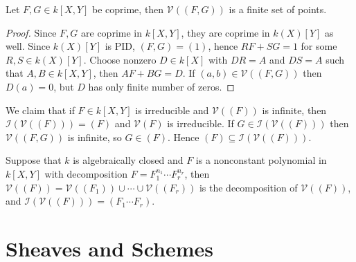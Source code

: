 \documentclass[11pt]{book}
\begin{document}
\begin{proposition}Let $F,G\in k[X,Y]$ be coprime, then $\mathcal{V}((F,G))$ is a finite set of points.
\begin{proof}
Since $F,G$ are coprime in $k[X,Y]$, they are coprime in $k(X)[Y]$ as well. Since $k(X)[Y]$ is PID, $(F,G)=(1)$, hence $RF+SG=1$ for some $R,S\in k(X)[Y]$. Choose nonzero $D\in k[X]$ with $DR=A$ and $DS=A$ such that $A,B\in k[X,Y]$, then $AF+BG=D$. If $(a,b)\in \mathcal{V}((F,G))$ then $D(a)=0$, but $D$ has only finite number of zeros. 
\end{proof}
\end{proposition}
We claim that if $F\in k[X,Y]$ is irreducible and $\mathcal{V}((F))$ is infinite, then $\mathcal{I}(\mathcal{V}((F)))=(F)$ and $\mathcal{V}(F)$ is irreducible. If $G\in \mathcal{I}(\mathcal{V}((F)))$ then $\mathcal{V}((F,G))$ is infinite, so $G\in (F)$. Hence $(F)\subseteq \mathcal{I}(\mathcal{V}((F)))$. 
\begin{proposition}Suppose that $k$ is algebraically closed and $F$ is a nonconstant polynomial in $k[X,Y]$ with decomposition $F=F_1^{n_1}\cdots F_r^{n_r}$, then $\mathcal{V}((F))=\mathcal{V}((F_1))\cup\cdots\cup \mathcal{V}((F_r))$ is the decomposition of $\mathcal{V}((F))$, and $\mathcal{I}(\mathcal{V}((F)))=(F_1\cdots F_r)$.
\end{proposition}
\chapter{Sheaves and Schemes}
\end{document}

